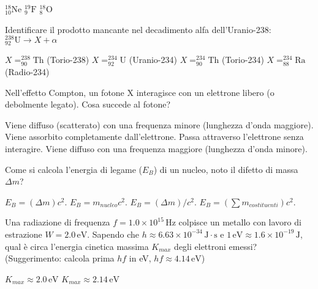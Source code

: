 \documentclass{exam}%
\begin{document}
\begin{questions}
\begin{multicols}{4}
\begin{choices}
\choice $^{18}_{10}\text{Ne}$%
\choice $^{19}_{9}\text{F}$%
\choice $^{18}_{8}\text{O}$%
\end{choices}%
\end{multicols}%
\question Identificare il prodotto mancante nel decadimento alfa dell'Uranio-238: $^{238}_{92}\text{U} \rightarrow X + \alpha$%
\vspace{0.2em}%
\begin{multicols}{4}%
\begin{choices}%
\choice $X = ^{238}_{90}\text{Th}$ (Torio-238)%
\choice $X = ^{234}_{92}\text{U}$ (Uranio-234)%
\choice $X = ^{234}_{90}\text{Th}$ (Torio-234)%
\choice $X = ^{234}_{88}\text{Ra}$ (Radio-234)%
\end{choices}%
\end{multicols}%
\question Nell'effetto Compton, un fotone X interagisce con un elettrone libero (o debolmente legato). Cosa succede al fotone?%
\vspace{0.2em}%
\begin{choices}%
\choice Viene diffuso (scatterato) con una frequenza minore (lunghezza d'onda maggiore).%
\choice Viene assorbito completamente dall'elettrone.%
\choice Passa attraverso l'elettrone senza interagire.%
\choice Viene diffuso con una frequenza maggiore (lunghezza d'onda minore).%
\end{choices}%
\question Come si calcola l'energia di legame ($E_B$) di un nucleo, noto il difetto di massa $\Delta m$?%
\vspace{0.2em}%
\begin{multicols}{4}%
\begin{choices}%
\choice $E_B = (\Delta m) c^2$.%
\choice $E_B = m_{nucleo} c^2$.%
\choice $E_B = (\Delta m) / c^2$.%
\choice $E_B = (\sum m_{costituenti}) c^2$.%
\end{choices}%
\end{multicols}%
\question Una radiazione di frequenza $f = 1.0 \times 10^{15} \, \text{Hz}$ colpisce un metallo con lavoro di estrazione $W = 2.0 \, \text{eV}$. Sapendo che $h \approx 6.63 \times 10^{-34} \, \text{J} \cdot \text{s}$ e $1 \, \text{eV} \approx 1.6 \times 10^{-19} \, \text{J}$, qual è circa l'energia cinetica massima $K_{max}$ degli elettroni emessi? (Suggerimento: calcola prima $hf$ in eV, $hf \approx 4.14 \, \text{eV}$)%
\vspace{0.2em}%
\begin{multicols}{4}%
\begin{choices}%
\choice $K_{max} \approx 2.0 \, \text{eV}$%
\choice $K_{max} \approx 2.14 \, \text{eV}$%

\end{choices}
\end{multicols}
\end{questions}
\end{document}
